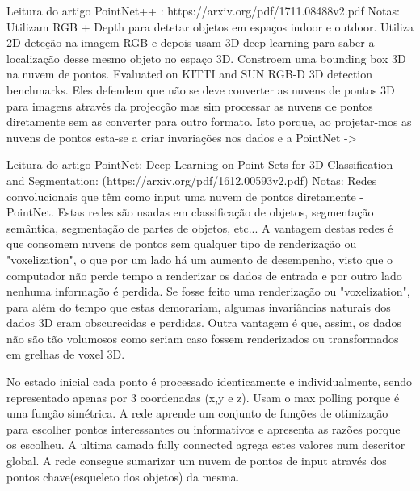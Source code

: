         Leitura do artigo PointNet++ : https://arxiv.org/pdf/1711.08488v2.pdf
        Notas: 
            Utilizam RGB + Depth para detetar objetos em espaços indoor e outdoor. Utiliza 2D deteção na imagem RGB e depois usam 3D deep learning para saber a localização desse mesmo objeto no espaço 3D. Constroem uma bounding box 3D na nuvem de pontos. Evaluated on KITTI and SUN RGB-D 3D detection benchmarks.
            Eles defendem que não se deve converter as nuvens de pontos 3D para imagens através da projecção mas sim processar as nuvens de pontos diretamente sem as converter para outro formato. Isto porque, ao projetar-mos as nuvens de pontos esta-se a criar invariações nos dados e a 
            PointNet -> 
            
            
        Leitura do artigo PointNet: Deep Learning on Point Sets for 3D Classification and Segmentation: (https://arxiv.org/pdf/1612.00593v2.pdf)
        Notas:
            Redes convolucionais que têm como input uma nuvem de pontos diretamente - PointNet. Estas redes são usadas em classificação de objetos, segmentação semântica, segmentação de partes de objetos, etc... A vantagem destas redes é que consomem nuvens de pontos sem qualquer tipo de renderização ou "voxelization", o que por um lado há um aumento de desempenho, visto que o computador não perde tempo a renderizar os dados de entrada e por outro lado nenhuma informação é perdida. Se fosse feito uma renderização ou "voxelization", para além do tempo que estas demorariam, algumas invariâncias naturais dos dados 3D eram obscurecidas e perdidas.
            Outra vantagem é que, assim, os dados não são tão volumosos como seriam caso fossem renderizados ou transformados em grelhas de voxel 3D.
            
            No estado inicial cada ponto é processado identicamente e individualmente, sendo representado apenas por 3 coordenadas (x,y e z). Usam o max polling porque é uma função simétrica. A rede aprende um conjunto de funções de otimização para escolher pontos interessantes ou informativos e apresenta as razões porque os escolheu. A ultima camada fully connected agrega estes valores num descritor global. A rede consegue sumarizar um nuvem de pontos de input através dos pontos chave(esqueleto dos objetos) da mesma.
            
